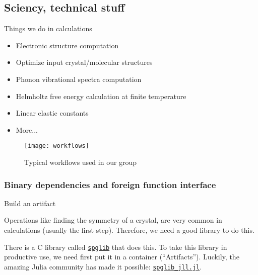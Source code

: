 \subsection{Sciency, technical stuff}

\begin{frame}{Things we do in \ab{} calculations}
    \begin{itemize}
        \item Electronic structure computation
        \item Optimize input crystal/molecular structures
        \item Phonon vibrational spectra computation
        \item Helmholtz free energy calculation at finite temperature
        \item Linear elastic constants
        \item More...
    \end{itemize}
    \begin{figure}[H]
        \centering
        \texttt{[image: workflows]}
        \caption{Typical \ab{} workflows used in our group}
        \label{eq:workflows}
    \end{figure}
\end{frame}

\subsubsection{Binary dependencies and foreign function interface}

\begin{frame}{Build an artifact}

    Operations like finding the symmetry of a crystal,
    are very common in \ab{} calculations (usually the first step).
    Therefore, we need a good library to do this.

    There is a C library called \href{https://github.com/spglib/spglib}{\texttt{spglib}}
    that does this.
    To take this library in productive use, we need first put it in a container
    (``Artifacts''). Luckily, the amazing Julia community has made it possible:
    \href{https://github.com/JuliaBinaryWrappers/spglib_jll.jl}{\texttt{spglib_jll.jl}}.

\end{frame}

